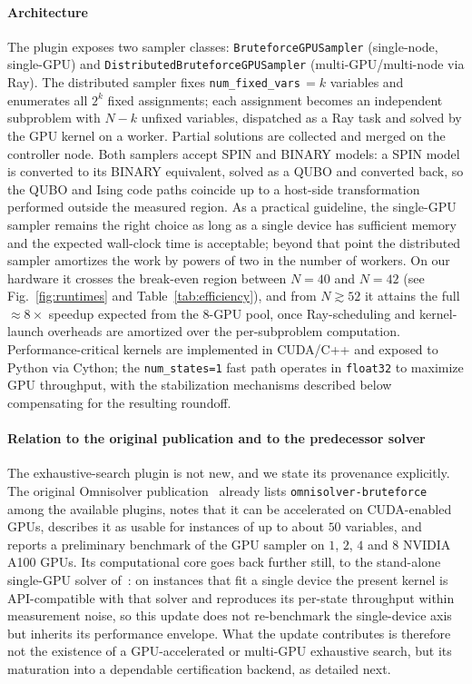 \documentclass[preprint,12pt,a4paper]{elsarticle}
\begin{document}
\paragraph{Architecture}
The plugin exposes two sampler classes: \texttt{BruteforceGPUSampler}
(single-node, single-GPU) and \texttt{DistributedBruteforceGPUSampler}
(multi-GPU/multi-node via Ray). The distributed sampler fixes
\texttt{num\_fixed\_vars}\,$=k$ variables and enumerates all $2^{k}$ fixed
assignments; each assignment becomes an independent subproblem with $N-k$
unfixed variables, dispatched as a Ray task and solved by the GPU kernel on a
worker. Partial solutions are collected and merged on the controller node. Both
samplers accept SPIN and BINARY models: a SPIN model is converted to its BINARY
equivalent, solved as a QUBO and converted back, so the QUBO and Ising code
paths coincide up to a host-side transformation performed outside the measured
region. As a practical guideline, the single-GPU sampler remains the right
choice as long as a single device has sufficient memory and the expected
wall-clock time is acceptable; beyond that point the distributed sampler
amortizes the work by powers of two in the number of workers. On our hardware it
crosses the break-even region between $N=40$ and $N=42$ (see
Fig.~\ref{fig:runtimes} and Table~\ref{tab:efficiency}), and from
$N\!\gtrsim\!52$ it attains the full $\approx\!8\times$ speedup expected from
the 8-GPU pool, once Ray-scheduling and kernel-launch overheads are amortized
over the per-subproblem computation. Performance-critical kernels are
implemented in CUDA/C++ and exposed to Python via Cython; the
\texttt{num\_states=1} fast path operates in \texttt{float32} to maximize GPU
throughput, with the stabilization mechanisms described below compensating for
the resulting roundoff.

\paragraph{Relation to the original publication and to the predecessor solver}
The exhaustive-search plugin is not new, and we state its provenance
explicitly. The original Omnisolver
publication~\cite{jalowiecki2021omnisolver} already lists
\texttt{omnisolver-bruteforce} among the available plugins, notes that it can be
accelerated on CUDA-enabled GPUs, describes it as usable for instances of up to
about $50$ variables, and reports a preliminary benchmark of the GPU sampler on
$1$, $2$, $4$ and $8$ NVIDIA A100 GPUs. Its computational core goes back further
still, to the stand-alone single-GPU solver of~\cite{jalowiecki2021brute}: on
instances that fit a single device the present kernel is API-compatible with
that solver and reproduces its per-state throughput within measurement noise, so
this update does not re-benchmark the single-device axis but inherits its
performance envelope. What the update contributes is therefore not the existence
of a GPU-accelerated or multi-GPU exhaustive search, but its maturation into a
dependable certification backend, as detailed next.
\end{document}
